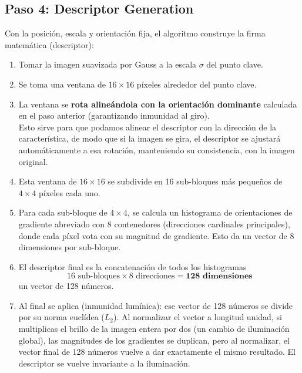 \subsection{Paso 4: Descriptor Generation}
\noindent
Con la posición, escala y orientación fija, el algoritmo construye la firma matemática (descriptor):
\begin{enumerate}
    \item Tomar la imagen suavizada por Gauss a la escala $\sigma$ del punto clave.
    \item Se toma una ventana de $16 \times 16$ píxeles alrededor del punto clave.
    \item La ventana se \textbf{rota alineándola con la orientación dominante} calculada en el paso anterior (garantizando inmunidad al giro). \\
    \noindent
    Esto sirve para que podamos alinear el descriptor con la dirección de la característica, de modo que si la imagen se gira, el descriptor se ajustará automáticamente a esa rotación, manteniendo su consistencia, con la imagen original.
    \item Esta ventana de $16 \times 16$ se subdivide en 16 sub-bloques más pequeños de $4 \times 4$ píxeles cada uno.
    \item Para cada sub-bloque de $4 \times 4$, se calcula un histograma de orientaciones de gradiente abreviado con 8 contenedores (direcciones cardinales principales), donde cada píxel vota con su magnitud de gradiente. Esto da un vector de 8 dimensiones por sub-bloque.
    \item El descriptor final es la concatenación de todos los histogramas
    $$16 \text{ sub-bloques} \times 8 \text{ direcciones} = \mathbf{128 \text{ dimensiones}}$$ 
    un vector de 128 números.
    \item Al final se aplica  (inmunidad lumínica): ese vector de 128 números se divide por su norma euclídea ($L_2$). Al normalizar el vector a longitud unidad, si multiplicas el brillo de la imagen entera por dos (un cambio de iluminación global), las magnitudes de los gradientes se duplican, pero al normalizar, el vector final de 128 números vuelve a dar exactamente el mismo resultado. El descriptor se vuelve invariante a la iluminación.
\end{enumerate}



